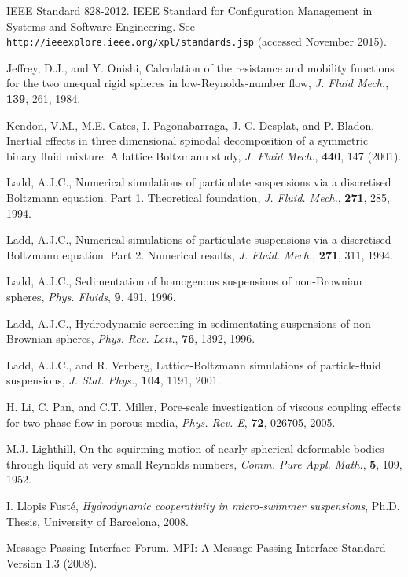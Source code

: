 \begin{thebibliography}{99}
IEEE Standard 828-2012. IEEE Standard for Configuration
Management in Systems and Software Engineering. 
See \texttt{http://ieeexplore.ieee.org/xpl/standards.jsp}
(accessed November 2015).

Jeffrey, D.J., and Y. Onishi,
Calculation of the resistance and mobility functions for the two
unequal rigid spheres in low-Reynolds-number flow,
\textit{J. Fluid Mech.}, \textbf{139}, 261, 1984.

Kendon, V.M., M.E. Cates, I. Pagonabarraga, J.-C. Desplat, and
P. Bladon,
Inertial effects in three dimensional spinodal decomposition of
a symmetric binary fluid mixture: A lattice Boltzmann study,
\textit{J. Fluid Mech.}, \textbf{440}, 147 (2001).

Ladd, A.J.C., Numerical simulations of particulate suspensions
via a discretised Boltzmann equation. Part 1. Theoretical foundation,
\textit{J. Fluid. Mech.}, \textbf{271}, 285, 1994.

Ladd, A.J.C., Numerical simulations of particulate suspensions
via a discretised Boltzmann equation. Part 2. Numerical results,
\textit{J. Fluid. Mech.}, \textbf{271}, 311, 1994.

Ladd, A.J.C., Sedimentation of homogenous suspensions of non-Brownian
spheres,
\textit{Phys. Fluids}, \textbf{9}, 491. 1996.

Ladd, A.J.C., Hydrodynamic screening in sedimentating suspensions
of non-Brownian spheres,
\textit{Phys. Rev. Lett.}, \textbf{76}, 1392, 1996.

Ladd, A.J.C., and R. Verberg,
Lattice-Boltzmann simulations of particle-fluid suspensions,
\textit{J. Stat. Phys.}, \textbf{104}, 1191, 2001.

H. Li, C. Pan, and C.T. Miller,
Pore-scale investigation of viscous coupling effects for two-phase
flow in porous media,
\textit{Phys. Rev. E}, \textbf{72}, 026705, 2005.

M.J. Lighthill,
On the squirming motion of nearly spherical deformable bodies through
liquid at very small Reynolds numbers,
\textit{Comm. Pure Appl. Math.}, \textbf{5}, 109, 1952.

I. Llopis Fust\'e,
\textit{Hydrodynamic cooperativity in micro-swimmer suspensions},
Ph.D. Thesis, University of Barcelona, 2008.

Message Passing Interface Forum. MPI: A Message Passing Interface Standard
Version 1.3 (2008).


\end{thebibliography}
